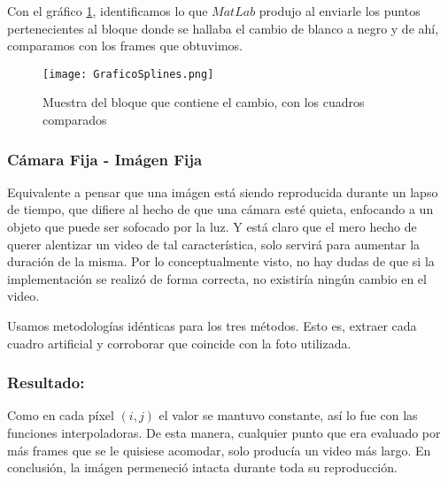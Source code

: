 Con el gr\'afico \ref{fig:splineValidacion}, identificamos lo que $MatLab$ produjo al enviarle los puntos pertenecientes al bloque donde se hallaba el cambio de blanco a negro y de ah\'i, comparamos con los frames que obtuvimos.

\begin{figure}[h!]
  \centering
    \texttt{[image: GraficoSplines.png]}
     \caption{Muestra del bloque que contiene el cambio, con los cuadros comparados}\label{fig:splineValidacion}
\end{figure}
\noindent

\subsubsection{C\'amara Fija - Im\'agen Fija}

Equivalente a pensar que una im\'agen est\'a siendo reproducida durante un lapso de tiempo, que difiere al hecho de que una c\'amara est\'e quieta, enfocando a un objeto que puede ser sofocado por la luz. Y est\'a claro que el mero hecho de querer alentizar un video de tal caracter\'istica, solo servir\'a para aumentar la duraci\'on de la misma. Por lo conceptualmente visto, no hay dudas de que si la implementaci\'on se realiz\'o de forma correcta, no existir\'ia ning\'un cambio en el video.

Usamos metodolog\'ias id\'enticas para los tres m\'etodos. Esto es, extraer cada cuadro artificial y corroborar que coincide con la foto utilizada.

\subsubsection*{\bf{Resultado:}}

Como en cada p\'ixel $(i,j)$ el valor se mantuvo constante, as\'i lo fue con las funciones interpoladoras. De esta manera, cualquier punto que era evaluado por m\'as frames que se le quisiese acomodar, solo produc\'ia un video m\'as largo. En conclusi\'on, la im\'agen permeneci\'o intacta durante toda su reproducci\'on.
